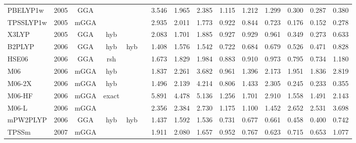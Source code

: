 \begin{landscape}
\begin{longtable}{lc:cccc:rrr:rrr:rrr}
    PBELYP1w         & 2005 & GGA  &          &             &           & 3.546             & 1.965             & 2.385  & 1.115              & 1.212             & 1.299  & 0.300   & 0.287 & 0.380 \\
    TPSSLYP1w        & 2005 & mGGA &          &             &           & 2.935             & 2.011             & 1.773  & 0.922              & 0.844             & 0.723  & 0.176   & 0.152 & 0.278 \\
    X3LYP            & 2005 & GGA  & hyb      &             &           & 2.083             & 1.701             & 1.885  & 0.927              & 0.929             & 0.961  & 0.349   & 0.273 & 0.633 \\
    B2PLYP           & 2006 & GGA  & hyb      & hyb         &           & 1.408             & 1.576             & 1.542  & 0.722              & 0.684             & 0.679  & 0.526   & 0.471 & 0.828 \\
    HSE06            & 2006 & GGA  & rsh      &             &           & 1.673             & 1.829             & 1.984  & 0.883              & 0.910             & 0.973  & 0.795   & 0.734 & 1.180 \\
    M06              & 2006 & mGGA & hyb      &             &           & 1.837             & 2.261             & 3.682  & 0.961              & 1.396             & 2.173  & 1.951   & 1.836 & 2.819 \\
    M06-2X           & 2006 & mGGA & hyb      &             &           & 1.496             & 2.139             & 4.214  & 0.806              & 1.433             & 2.305  & 0.245   & 0.233 & 0.355 \\
    M06-HF           & 2006 & mGGA & exact    &             &           & 5.891             & 4.478             & 5.136  & 1.256              & 1.701             & 2.910  & 1.558   & 1.491 & 2.143 \\
    M06-L            & 2006 & mGGA &          &             &           & 2.356             & 2.384             & 2.730  & 1.175              & 1.100             & 1.452  & 2.652   & 2.531 & 3.698 \\
    mPW2PLYP         & 2006 & GGA  & hyb      & hyb         &           & 1.437             & 1.592             & 1.536  & 0.731              & 0.677             & 0.661  & 0.458   & 0.400 & 0.742 \\
    TPSSm            & 2007 & mGGA &          &             &           & 1.911             & 2.080             & 1.657  & 0.952              & 0.767             & 0.623  & 0.715   & 0.653 & 1.077 \\

\end{longtable}
\end{landscape}
